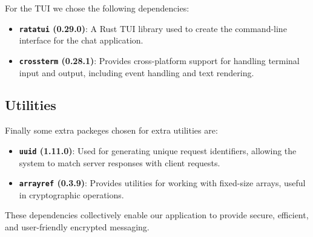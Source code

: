 For the TUI we chose the following dependencies:

\begin{itemize}
  \item \textbf{\texttt{ratatui} (0.29.0)}: A Rust TUI library used to create the command-line interface for the chat application.
  \item \textbf{\texttt{crossterm} (0.28.1)}: Provides cross-platform support for handling terminal input and output, including event handling and text rendering.
\end{itemize}

\subsection{Utilities}
\label{subsec:Utilities}

Finally some extra packeges chosen for extra utilities are:

\begin{itemize}
  \item \textbf{\texttt{uuid} (1.11.0)}: Used for generating unique request identifiers, allowing the system to match server responses with client requests.
  \item \textbf{\texttt{arrayref} (0.3.9)}: Provides utilities for working with fixed-size arrays, useful in cryptographic operations.
\end{itemize}

These dependencies collectively enable our application to provide secure, efficient, and user-friendly encrypted messaging.  
